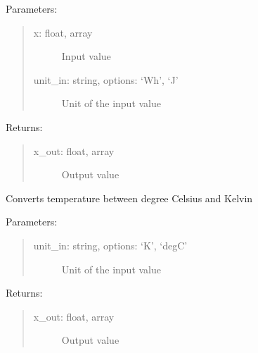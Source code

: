 \documentclass[letterpaper,10pt,english,openany]{sphinxmanual}
\begin{document}
\begin{fulllineitems}
\begin{fulllineitems}
Parameters:
\begin{quote}
\begin{description}
\item[{x: float, array}] \leavevmode
Input value

\item[{unit\_in: string, options: ‘Wh’, ‘J’}] \leavevmode
Unit of the input value

\end{description}
\end{quote}

Returns:
\begin{quote}
\begin{description}
\item[{x\_out: float, array}] \leavevmode
Output value

\end{description}
\end{quote}

\end{fulllineitems}


\begin{fulllineitems}
\label{\detokenize{source/mswh.tools:mswh.tools.unit_converters.UnitConv.degC_K}}
Converts temperature between degree Celsius and Kelvin

Parameters:
\begin{quote}
\begin{description}
\item[{unit\_in: string, options: ‘K’, ‘degC’}] \leavevmode
Unit of the input value

\end{description}
\end{quote}

Returns:
\begin{quote}
\begin{description}
\item[{x\_out: float, array}] \leavevmode
Output value

\end{description}
\end{quote}

\end{fulllineitems}



\end{fulllineitems}
\end{document}
